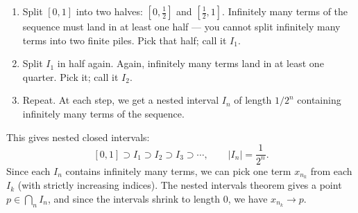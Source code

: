 \documentclass[../master/master.tex]{subfiles}
\begin{document}
\begin{enumerate}
    \item Split $[0,1]$ into two halves: $[0, \tfrac{1}{2}]$ and $[\tfrac{1}{2}, 1]$. Infinitely many terms of the sequence must land in at least one half --- you cannot split infinitely many terms into two finite piles. Pick that half; call it $I_1$.

    \item Split $I_1$ in half again. Again, infinitely many terms land in at least one quarter. Pick it; call it $I_2$.

    \item Repeat. At each step, we get a nested interval $I_n$ of length $1/2^n$ containing infinitely many terms of the sequence.
\end{enumerate}

This gives nested closed intervals:
\[
    [0,1] \supset I_1 \supset I_2 \supset I_3 \supset \cdots, \qquad |I_n| = \frac{1}{2^n}.
\]
Since each $I_n$ contains infinitely many terms, we can pick one term $x_{n_k}$ from each $I_k$ (with strictly increasing indices). The nested intervals theorem gives a point $p \in \bigcap_n I_n$, and since the intervals shrink to length $0$, we have $x_{n_k} \to p$.

\begin{center}
\end{center}
\end{document}
